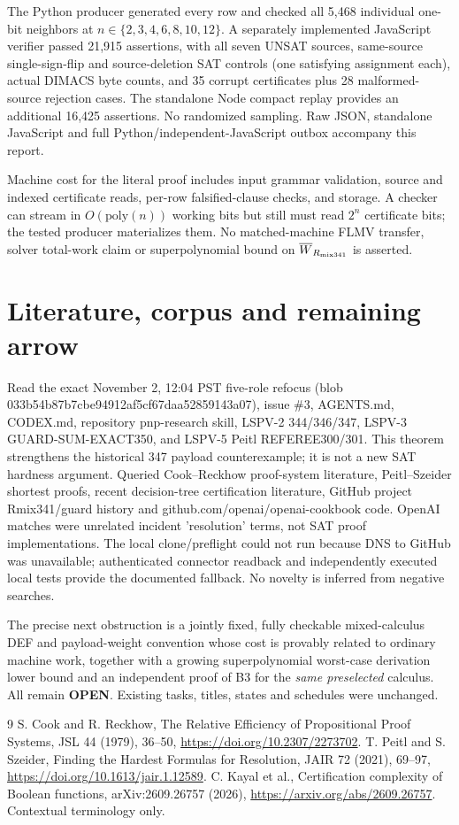 \documentclass[11pt]{article}
\begin{document}
The Python producer generated every row and checked all 5,468 individual one-bit neighbors at $n\in\{2,3,4,6,8,10,12\}$. A separately implemented JavaScript verifier passed 21,915 assertions, with all seven UNSAT sources, same-source single-sign-flip and source-deletion SAT controls (one satisfying assignment each), actual DIMACS byte counts, and 35 corrupt certificates plus 28 malformed-source rejection cases. The standalone Node compact replay provides an additional 16,425 assertions. No randomized sampling. Raw JSON, standalone JavaScript and full Python/independent-JavaScript outbox accompany this report.

Machine cost for the literal proof includes input grammar validation, source and indexed certificate reads, per-row falsified-clause checks, and storage. A checker can stream in $O(\mathrm{poly}(n))$ working bits but still must read $2^n$ certificate bits; the tested producer materializes them. No matched-machine FLMV transfer, solver total-work claim or superpolynomial bound on $\overline W_{R_{\rm mix341}}$ is asserted.

\section{Literature, corpus and remaining arrow}
Read the exact November 2, 12:04 PST five-role refocus (blob 033b54b87b7cbe94912af5cf67daa52859143a07), issue \#3, AGENTS.md, CODEX.md, repository pnp-research skill, LSPV-2 344/346/347, LSPV-3 GUARD-SUM-EXACT350, and LSPV-5 Peitl REFEREE300/301. This theorem strengthens the historical 347 payload counterexample; it is not a new SAT hardness argument. Queried Cook--Reckhow proof-system literature, Peitl--Szeider shortest proofs, recent decision-tree certification literature, GitHub project Rmix341/guard history and github.com/openai/openai-cookbook code. OpenAI matches were unrelated incident 'resolution' terms, not SAT proof implementations. The local clone/preflight could not run because DNS to GitHub was unavailable; authenticated connector readback and independently executed local tests provide the documented fallback. No novelty is inferred from negative searches.

The precise next obstruction is a jointly fixed, fully checkable mixed-calculus DEF and payload-weight convention whose cost is provably related to ordinary machine work, together with a growing superpolynomial worst-case derivation lower bound and an independent proof of B3 for the \emph{same preselected} calculus. All remain \textbf{OPEN}. Existing tasks, titles, states and schedules were unchanged.

\begin{thebibliography}{9}
 S. Cook and R. Reckhow, The Relative Efficiency of Propositional Proof Systems, JSL 44 (1979), 36--50, \url{https://doi.org/10.2307/2273702}.
 T. Peitl and S. Szeider, Finding the Hardest Formulas for Resolution, JAIR 72 (2021), 69--97, \url{https://doi.org/10.1613/jair.1.12589}.
 C. Kayal et al., Certification complexity of Boolean functions, arXiv:2609.26757 (2026), \url{https://arxiv.org/abs/2609.26757}. Contextual terminology only.
\end{thebibliography}
\end{document}
